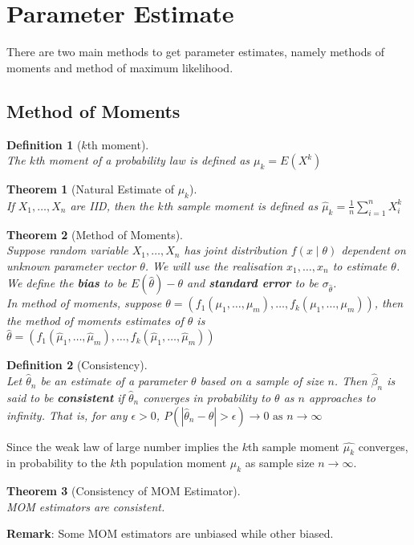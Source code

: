 \documentclass[12pt]{article}
\newtheorem{definition}{Definition}[section]
\newtheorem{theorem}{Theorem}[section]
\theoremstyle{definition}
\begin{document}
\section{Parameter Estimate}
There are two main methods to get parameter estimates, namely methods of moments and method of maximum likelihood.
\subsection{Method of Moments}
\begin{definition}[{$k$}th moment]
\hfill\\\normalfont The $k$th moment of a probability law is defined as 
$
\mu_k = E(X^k)
$
\end{definition}
\begin{theorem}[Natural Estimate of {$\mu_k$}]
\hfill\\\normalfont If $X_1,\ldots, X_n$ are IID, then the $k$th sample moment is defined as
$
\hat{\mu}_k=\frac{1}{n}\sum_{i=1}^n X_i^k
$
\end{theorem}
\begin{theorem}[Method of Moments]
\hfill\\\normalfont Suppose random variable $X_1,\ldots, X_n$ has joint distribution $f(x\mid \theta)$ dependent on unknown parameter vector $\theta$. We will use the realisation $x_1,\ldots, x_n$ to estimate $\theta$. We define the \textbf{bias} to be $E(\hat{\theta})-\theta$ and \textbf{standard error} to be $\sigma_{\hat{\theta}}$.\\
In method of moments, suppose $\theta = (f_1(\mu_1,\ldots, \mu_m),\ldots, f_k(\mu_1,\ldots, \mu_m))$, then the method of moments estimates of $\theta$ is
$
\hat{\theta}=(f_1(\hat{\mu}_1,\ldots, \hat{\mu}_m),\ldots, f_k(\hat{\mu}_1,\ldots, \hat{\mu}_m))
$
\end{theorem}
\begin{definition}[Consistency]
\hfill\\\normalfont Let $\hat{\theta}_n$ be an estimate of a parameter $\theta$ based on a sample of size $n$. Then $\hat{\beta}_n$ is said to be \textbf{consistent} if $\hat{\theta}_n$ converges in probability to $\theta$ as $n$ approaches to infinity. That is, for any $\epsilon>0$,
$
P(|\hat{\theta}_n-\theta|>\epsilon)\to 0\text{ as }n\to\infty
$
\end{definition}
Since the weak law of large number implies the $k$th sample moment $\hat{\mu_k}$ converges, in probability to the $k$th population moment $\mu_k$ as sample size $n\to\infty$.
\begin{theorem}[Consistency of MOM Estimator]
\hfill\\\normalfont MOM estimators are consistent.
\end{theorem}
\textbf{Remark}: Some MOM estimators are unbiased while other biased.
\end{document}
